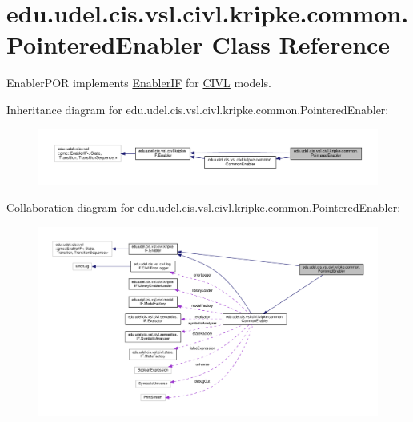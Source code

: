 \hypertarget{classedu_1_1udel_1_1cis_1_1vsl_1_1civl_1_1kripke_1_1common_1_1PointeredEnabler}{}\section{edu.\+udel.\+cis.\+vsl.\+civl.\+kripke.\+common.\+Pointered\+Enabler Class Reference}
\label{classedu_1_1udel_1_1cis_1_1vsl_1_1civl_1_1kripke_1_1common_1_1PointeredEnabler}


Enabler\+P\+O\+R implements \hyperlink{}{Enabler\+I\+F} for \hyperlink{classedu_1_1udel_1_1cis_1_1vsl_1_1civl_1_1CIVL}{C\+I\+V\+L} models.  




Inheritance diagram for edu.\+udel.\+cis.\+vsl.\+civl.\+kripke.\+common.\+Pointered\+Enabler\+:
\nopagebreak
\begin{figure}[H]
\begin{center}
\leavevmode
\includegraphics[width=350pt]{classedu_1_1udel_1_1cis_1_1vsl_1_1civl_1_1kripke_1_1common_1_1PointeredEnabler__inherit__graph}
\end{center}
\end{figure}


Collaboration diagram for edu.\+udel.\+cis.\+vsl.\+civl.\+kripke.\+common.\+Pointered\+Enabler\+:
\nopagebreak
\begin{figure}[H]
\begin{center}
\leavevmode
\includegraphics[width=350pt]{classedu_1_1udel_1_1cis_1_1vsl_1_1civl_1_1kripke_1_1common_1_1PointeredEnabler__coll__graph}
\end{center}
\end{figure}

